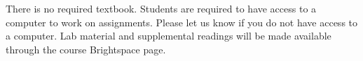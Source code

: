 There is no required textbook. Students are required to have access to a computer to work on assignments. Please let us know if you do not have access to a computer. Lab material and supplemental readings will be made available through the course Brightspace page.
